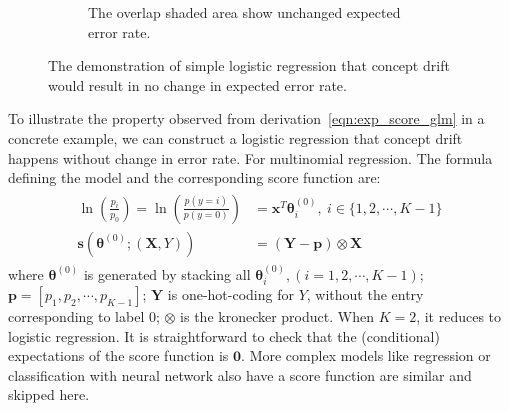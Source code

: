\documentclass[twoside,11pt]{article}
\begin{document}
\begin{figure}[!htbp]
\begin{subfigure}[t]{0.5\linewidth}
         \caption{The overlap shaded area show unchanged expected error rate.}
         \label{fig:logi_err_rate_unch_c}
  \end{subfigure}
  \caption{The demonstration of simple logistic regression that concept drift would result in no change in expected error rate.}
  \label{fig:logi_err_rate_unch}
\end{figure}

To illustrate the property observed from derivation~\ref{eqn:exp_score_glm} in a concrete example, we can construct a logistic regression that concept drift happens without change in error rate. For multinomial regression. The formula defining the model and the corresponding score function are:
\begin{align}
\begin{aligned}
\ln (\frac{p_i}{p_0}) = \ln (\frac{p(y=i)}{p(y=0)})&=\bm {x}^{T} \bm { \theta}_i^{(0)}, ~ i \in \{1,2,\cdots,K-1\} \\
\bm {s}(\bm { \theta} ^{ (0)}; (\bm {X}, Y)) &= (\bm {Y}-\bm {p})\otimes \bm {X}
\end{aligned}
\label{eqn:multi_score}
\end{align}
where $\bm { \theta} ^{ (0)}$ is generated by stacking all $ \bm { \theta}_i ^{(0)}, (i=1,2,\cdots,K-1)$; $\bm {p}=[p_1, p_2, \cdots, p _{K-1}]$; $\bm {Y}$ is one-hot-coding for $Y$, without the entry corresponding to label $0$; $\otimes$ is the kronecker product. When $K=2$, it reduces to logistic regression. It is straightforward to check that the (conditional) expectations of the score function is $\bm {0}$. More complex models like regression or classification with neural network also have a score function are similar and skipped here. 
\end{document}

